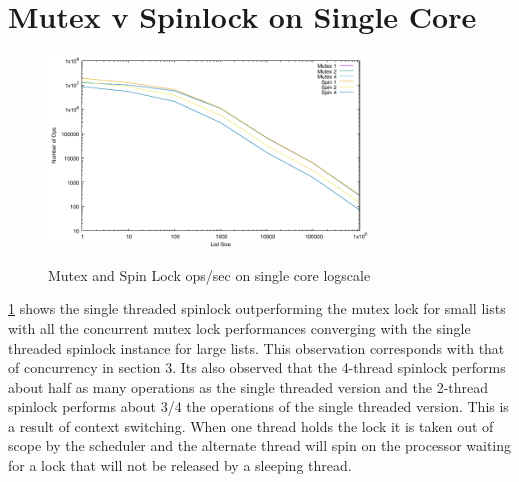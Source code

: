 \documentclass{article}
\begin{document}
\section{Mutex v Spinlock on Single Core}
	\begin{figure}[h]
		\centering
		\includegraphics[height=2in]{outputData/bfl_spin_v_mutex.pdf}
		\label{f:Fig.3}
		\caption{Mutex and Spin Lock ops/sec on single core logscale}
	\end{figure}
\ref{f:Fig.3} shows the single threaded spinlock outperforming the mutex lock for small 
lists with all the concurrent mutex lock performances converging with the single threaded 
spinlock instance for large lists. This observation corresponds with that of concurrency 
in section 3. 
\newline
\newline
Its also observed that the 4-thread spinlock performs about half as many operations as 
the single threaded version and the 2-thread spinlock performs about 3/4 the operations of 
the single threaded version. This is a result of context switching. When one thread holds 
the lock it is taken out of scope by the scheduler and the alternate thread will spin on 
the processor waiting for a lock that will not be released by a sleeping thread. 
\end{document}
